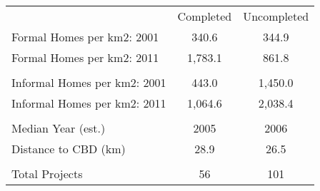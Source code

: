 \begin{tabu}{lcc}
 & Completed & Uncompleted \\ 
 Formal Homes per km2: 2001  & 340.6  & 344.9  \\ 
 Formal Homes per km2: 2011  & 1,783.1  & 861.8  \\ 
 &  &  \\ 
 Informal Homes per km2: 2001  & 443.0  & 1,450.0  \\ 
 Informal Homes per km2: 2011  & 1,064.6  & 2,038.4  \\ 
 &  &  \\ 
 Median Year (est.)  & 2005  & 2006  \\ 
 Distance to CBD (km)  & 28.9  & 26.5  \\ 
 &  &  \\ 
 Total Projects   & 56  & 101  \\ 
\bottomrule
\end{tabu}
